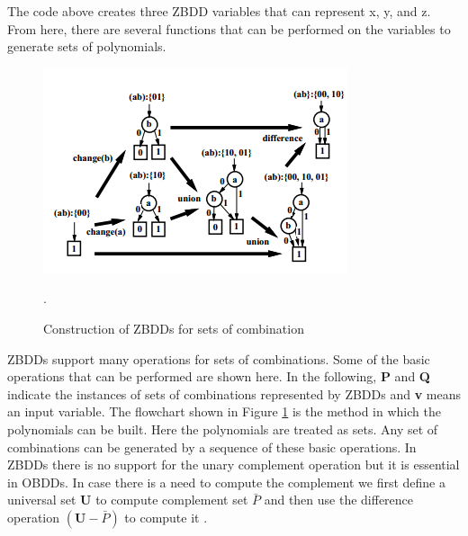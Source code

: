 \documentclass[letterpaper, 10 pt, conference]{ieeeconf}
\begin{document}
The code above creates three ZBDD variables that can represent x, y, and z.  From here, there are several functions that can be performed on the variables to generate sets of polynomials.

\begin{figure}[b]\centering
\includegraphics[scale=.90]{construction}
\caption{Construction of ZBDDs for sets of combination \cite{minato2001zero}}.
\label{fig:construction}
\end{figure}

ZBDDs support many operations for sets of combinations. Some of the basic operations that can be performed are shown here. In the following, \textbf{P} and \textbf{Q} indicate the instances of sets of combinations represented by ZBDDs and \textbf{v} means an input variable. The flowchart shown in Figure \ref{fig:construction} is the method in which the polynomials can be built. Here the polynomials are treated as sets. Any set of combinations can be generated by a sequence of these basic operations. In ZBDDs there is no support for the unary complement operation but it is essential in OBDDs. In case there is a need to compute the complement we first define a universal set \textbf{U} to compute complement set $\bar{P}$ and then use the difference operation $(\textbf{U} - \bar{P})$ to compute it \cite{minato2001zero}.
\end{document}

